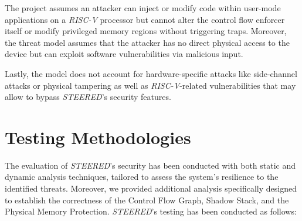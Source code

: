 The project assumes an attacker can inject or modify code within user-mode
applications on a \textit{RISC-V} processor but cannot alter the control flow enforcer
itself or modify privileged memory regions without triggering traps. Moreover, the
threat model assumes that the attacker has no direct physical access to the device
but can exploit software vulnerabilities via malicious input.

Lastly, the model does not account for hardware-specific attacks like side-channel
attacks or physical tampering as well as \textit{RISC-V}-related vulnerabilities
that may allow to bypass \textit{STEERED}'s security features.

\section{Testing Methodologies}
\label{sec:ta_methodologies}

The evaluation of \textit{STEERED}'s security has been conducted with both
static and dynamic analysis techniques, tailored to assess the system's resilience
to the identified threats. Moreover, we provided additional analysis specifically
designed to establish the correctness of the Control Flow Graph, Shadow Stack, and
the Physical Memory Protection. \textit{STEERED}'s testing has been conducted as
follows:


